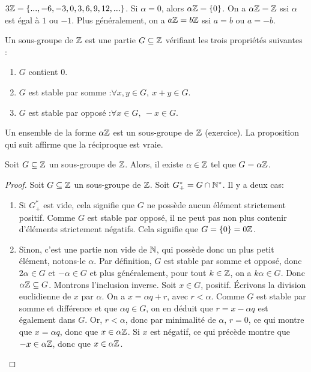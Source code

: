 \begin{exemple}
$3\mathbb{Z} = \{...,-6,-3,0,3,6,9,12,...\}$. Si $\alpha=0$, alors $\alpha\mathbb{Z} = \{0\}$. On a $\alpha\mathbb{Z} = \mathbb{Z}$ ssi $\alpha$ est égal à $1$ ou $-1$. Plus généralement, on a $a\mathbb{Z}=b\mathbb{Z}$ ssi $a=b$ ou $a=-b$.
\end{exemple}


\begin{definition}
Un sous-groupe de $\mathbb{Z}$ est une partie $G \subseteq \mathbb{Z}$ vérifiant les trois propriétés suivantes : 
\begin{enumerate}
\item $G$ contient $0$.
\item $G$ est stable par somme :$\forall x, y\in G, \: x+y \in G$.
\item $G$ est stable par opposé :$\forall x\in G, \: -x \in G$.
\end{enumerate}
\end{definition}

Un ensemble de la forme $\alpha\mathbb{Z}$ est un sous-groupe de $\mathbb{Z}$ (exercice). La proposition qui suit affirme que la réciproque est vraie.

\begin{proposition}
Soit $G\subseteq \mathbb{Z}$ un sous-groupe de $\mathbb{Z}$. Alors, il existe $\alpha \in \mathbb{Z}$ tel que $G = \alpha\mathbb{Z}$. 
\end{proposition}


\begin{proof}
Soit $G \subseteq \mathbb{Z}$ un sous-groupe de $\mathbb{Z}$. Soit $G^*_+ = G \cap \mathbb{N}^*$. Il y a deux cas:
\begin{enumerate}
\item Si $G^*_+$ est vide, cela signifie que $G$ ne possède aucun élément strictement positif. Comme $G$ est stable par opposé, il ne peut pas non plus contenir d'éléments strictement négatifs. Cela signifie que $G=\{0\} = 0\mathbb{Z}$.
\item Sinon, c'est une partie non vide de $\mathbb{N}$, qui possède donc un plus petit élément, notons-le $\alpha$.
Par définition, $G$ est stable par somme et opposé, donc $2\alpha\in G$ et $-\alpha \in G$ et plus généralement, pour tout $k\in \mathbb{Z}$, on a $k\alpha \in G$.
Donc $\alpha\mathbb{Z} \subseteq G$. Montrons l'inclusion inverse.
Soit $x\in G$, positif. \'Ecrivons la division euclidienne de $x$ par $\alpha$. On a $x = \alpha q + r$, avec $r<\alpha$. Comme $G$ est stable par somme et différence et que $\alpha q \in G$, on en déduit que $r = x-\alpha q$ est également dans $G$. Or, $r<\alpha$, donc par minimalité de $\alpha$, $r=0$, ce qui montre que $x = \alpha q$, donc que $x\in \alpha\mathbb{Z}$.
Si $x$ est négatif, ce qui précède montre que $-x\in \alpha\mathbb{Z}$, donc que $x\in \alpha\mathbb{Z}$.
\end{enumerate}
\end{proof}

